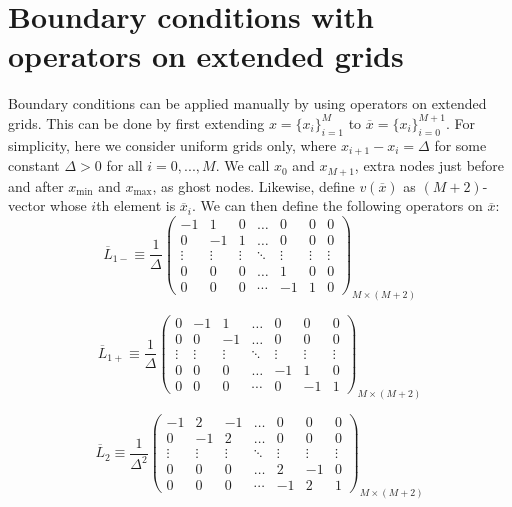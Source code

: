 \documentclass[11pt]{article}
\begin{document}
\section{Boundary conditions with operators on extended grids}
Boundary conditions can be applied manually by using operators on extended grids. This can be done by first extending $x = \{x_i\}_{i=1}^M$ to $ \overline{x} = \{x_i\}_{i=0}^{M+1}$. For simplicity, here we consider uniform grids only, where $x_{i+1} - x_i = \Delta$ for some constant $\Delta > 0$ for all $i = 0, ..., M$. We call $x_0$ and $x_{M+1}$, extra nodes just before and after $x_{\min}$ and $x_{\max}$, as ghost nodes. Likewise, define $v(\overline{x})$ as $(M+2)$-vector whose $i$th element is $\overline {x}_i$. We can then define the following operators on $\overline{x}$:
\begin{equation}\label{eq:L-1-plus-extended}
\overline{L}_{1-} \equiv \frac{1}{\Delta}\begin{pmatrix}
-1&1&0&\dots&0&0&0\\
0&-1&1&\dots&0&0&0\\
\vdots&\vdots&\vdots&\ddots&\vdots&\vdots&\vdots\\
0&0&0&\dots&1&0&0\\
0&0&0&\cdots&-1&1&0
\end{pmatrix}_{M\times (M+2)}
\end{equation}

\begin{equation}\label{eq:L-1-minus-extended}
\overline{L}_{1+} \equiv \frac{1}{\Delta}\begin{pmatrix}
0&-1&1&\dots&0&0&0\\
0&0&-1&\dots&0&0&0\\
\vdots&\vdots&\vdots&\ddots&\vdots&\vdots&\vdots\\
0&0&0&\dots&-1&1&0\\
0&0&0&\cdots&0&-1&1
\end{pmatrix}_{M\times (M+2)} 
\end{equation}

\begin{equation}\label{eq:L-2-extended}
\overline{L}_2 \equiv \frac{1}{\Delta^2}\begin{pmatrix}
-1&2&-1&\dots&0&0&0\\
0&-1&2&\dots&0&0&0\\
\vdots&\vdots&\vdots&\ddots&\vdots&\vdots&\vdots\\
0&0&0&\dots&2&-1&0\\
0&0&0&\cdots&-1&2&1
\end{pmatrix}_{M\times (M+2)}
\end{equation}
\end{document}
